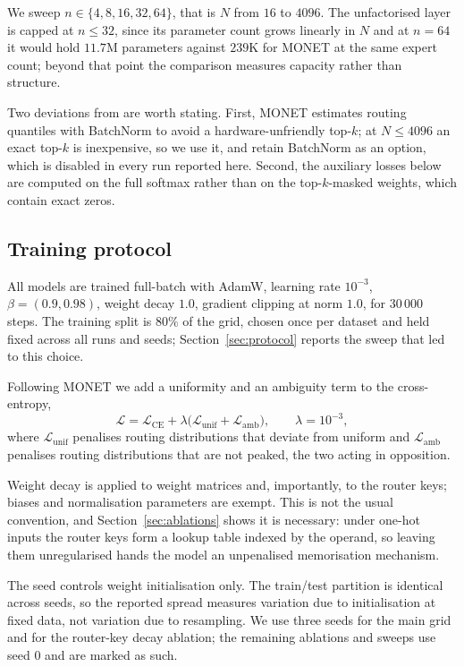We sweep $n \in \{4, 8, 16, 32, 64\}$, that is $N$ from $16$ to $4096$. The
unfactorised layer is capped at $n \le 32$, since its parameter count grows
linearly in $N$ and at $n = 64$ it would hold $11.7$M parameters against
$239$K for MONET at the same expert count; beyond that point the comparison
measures capacity rather than structure.

Two deviations from \citet{park2025monet} are worth stating. First, MONET
estimates routing quantiles with BatchNorm to avoid a hardware-unfriendly
top-$k$; at $N \le 4096$ an exact top-$k$ is inexpensive, so we use it, and retain BatchNorm as an option, which is disabled in every run reported here. Second, the auxiliary losses below are computed
on the full softmax rather than on the top-$k$-masked weights, which contain
exact zeros.

\subsection{Training protocol}

All models are trained full-batch with AdamW, learning rate $10^{-3}$,
$\beta = (0.9, 0.98)$, weight decay $1.0$, gradient clipping at norm $1.0$,
for $30\,000$ steps. The training split is $80\%$ of the grid, chosen once per
dataset and held fixed across all runs and seeds; Section~\ref{sec:protocol}
reports the sweep that led to this choice.

Following MONET we add a uniformity and an ambiguity term to the
cross-entropy,
\begin{equation}
  \mathcal{L}
  = \mathcal{L}_{\mathrm{CE}}
  + \lambda\big(\mathcal{L}_{\mathrm{unif}} + \mathcal{L}_{\mathrm{amb}}\big),
  \qquad \lambda = 10^{-3},
\end{equation}
where $\mathcal{L}_{\mathrm{unif}}$ penalises routing distributions that
deviate from uniform and $\mathcal{L}_{\mathrm{amb}}$ penalises routing
distributions that are not peaked, the two acting in opposition.

Weight decay is applied to weight matrices and, importantly, to the router
keys; biases and normalisation parameters are exempt. This is not the usual
convention, and Section~\ref{sec:ablations} shows it is necessary: under
one-hot inputs the router keys form a lookup table indexed by the operand, so
leaving them unregularised hands the model an unpenalised memorisation
mechanism.

The seed controls weight initialisation only. The train/test partition is
identical across seeds, so the reported spread measures variation due to
initialisation at fixed data, not variation due to resampling. We use three seeds for the main grid and for the router-key decay ablation;
the remaining ablations and sweeps use seed $0$ and are marked as such.

